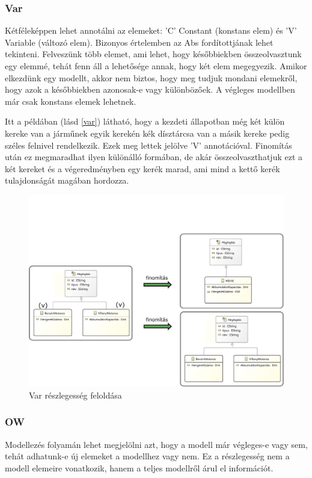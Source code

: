 \subsubsection{Var}
Kétféleképpen lehet annotálni az elemeket: \textsf{’C’} Constant (konstans elem) és \textsf{’V’} Variable (változó elem). Bizonyos értelemben az Abs fordítottjának lehet tekinteni. Felveszünk több elemet, ami lehet, hogy későbbiekben összeolvasztunk egy elemmé, tehát fenn áll a lehetősége annak, hogy két elem megegyezik. Amikor elkezdünk egy modellt, akkor nem biztos, hogy meg tudjuk mondani elemekről, hogy azok a későbbiekben azonosak-e vagy különbözőek. A végleges modellben már csak konstans elemek lehetnek.
\par
Itt a példában (lásd \autoref{var}) látható, hogy a kezdeti állapotban még két külön kereke van a járműnek egyik kerekén kék dísztárcsa van a másik kereke pedig széles felnivel rendelkezik. Ezek meg lettek jelölve \textsf{'V'} annotációval. Finomítás után ez megmaradhat ilyen különálló formában, de akár összeolvaszthatjuk ezt a két kereket és a végeredményben egy kerék marad, ami mind a kettő kerék tulajdonságát magában hordozza.

\begin{figure}[htp]
	\centering
	\includegraphics[width=130mm, keepaspectratio]{figures/var.pdf}
	\caption{Var részlegesség feloldása} 
	\label{var}
\end{figure}

\subsubsection{OW}
Modellezés folyamán lehet megjelölni azt, hogy a modell már végleges-e vagy sem, tehát adhatunk-e új elemeket a modellhez vagy nem. Ez a részlegesség nem a modell elemeire vonatkozik, hanem a teljes modellről árul el információt. 
